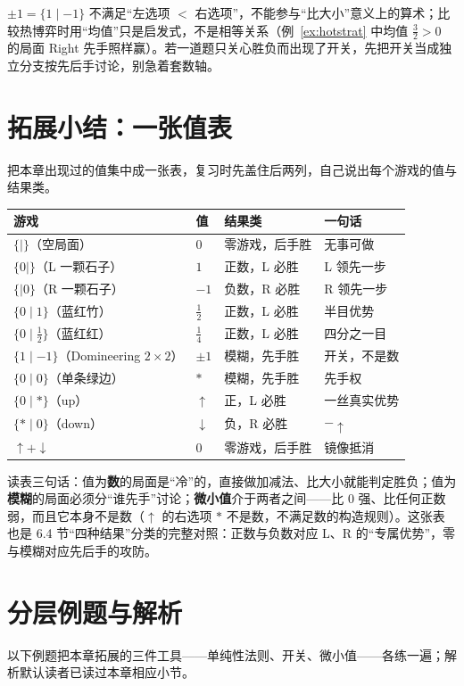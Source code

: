 \begin{pitfall}[开关不是数]
$\pm1=\{1\mid -1\}$ 不满足“左选项 $<$ 右选项”，不能参与“比大小”意义上的算术；比较热博弈时用“均值”只是启发式，不是相等关系（例~\ref{ex:hotstrat} 中均值 $\tfrac32>0$ 的局面 Right 先手照样赢）。若一道题只关心胜负而出现了开关，先把开关当成独立分支按先后手讨论，别急着套数轴。
\end{pitfall}

\section{拓展小结：一张值表}
把本章出现过的值集中成一张表，复习时先盖住后两列，自己说出每个游戏的值与结果类。

\begin{center}
\begin{tabular}{llll}
\toprule
游戏 & 值 & 结果类 & 一句话\\
\midrule
$\{\mid\}$（空局面） & $0$ & 零游戏，后手胜 & 无事可做\\
$\{0\mid\}$（L 一颗石子） & $1$ & 正数，L 必胜 & L 领先一步\\
$\{\mid 0\}$（R 一颗石子） & $-1$ & 负数，R 必胜 & R 领先一步\\
$\{0\mid 1\}$（蓝红竹） & $\tfrac12$ & 正数，L 必胜 & 半目优势\\
$\{0\mid \tfrac12\}$（蓝红红） & $\tfrac14$ & 正数，L 必胜 & 四分之一目\\
$\{1\mid -1\}$（Domineering $2\times2$） & $\pm1$ & 模糊，先手胜 & 开关，不是数\\
$\{0\mid 0\}$（单条绿边） & $\ast$ & 模糊，先手胜 & 先手权\\
$\{0\mid \ast\}$（up） & $\uparrow$ & 正，L 必胜 & 一丝真实优势\\
$\{\ast\mid 0\}$（down） & $\downarrow$ & 负，R 必胜 & $-\uparrow$\\
$\uparrow+\downarrow$ & $0$ & 零游戏，后手胜 & 镜像抵消\\
\bottomrule
\end{tabular}
\end{center}

读表三句话：值为\textbf{数}的局面是“冷”的，直接做加减法、比大小就能判定胜负；值为\textbf{模糊}的局面必须分“谁先手”讨论；\textbf{微小值}介于两者之间——比 $0$ 强、比任何正数弱，而且它本身不是数（$\uparrow$ 的右选项 $\ast$ 不是数，不满足数的构造规则）。这张表也是 6.4 节“四种结果”分类的完整对照：正数与负数对应 L、R 的“专属优势”，零与模糊对应先后手的攻防。

\section{分层例题与解析}
以下例题把本章拓展的三件工具——单纯性法则、开关、微小值——各练一遍；解析默认读者已读过本章相应小节。

